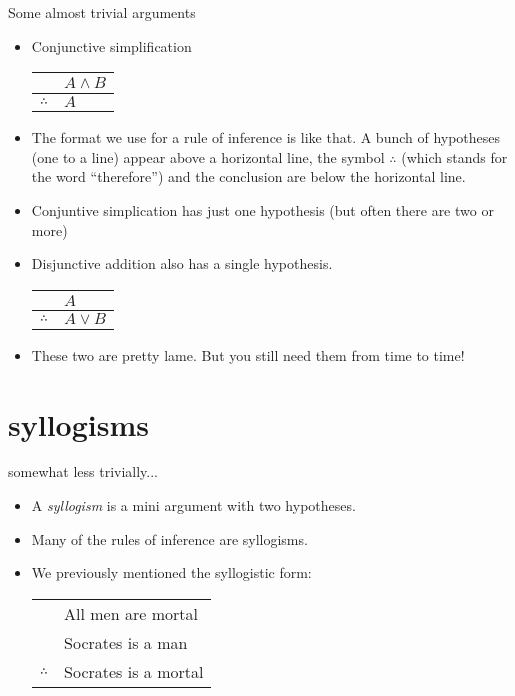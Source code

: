 \documentclass[landscape]{beamer}
\begin{document}
\begin{frame}{Some almost trivial arguments}
\begin{itemize}
\item Conjunctive simplification \pause 
\newline 

\begin{center}
\begin{tabular}{cl}
 & $A \land B$ \\ \hline
$\therefore$ & $A$ \\
\end{tabular}
\end{center}
\pause 

\item The format we use for a rule of inference is like that.  A bunch of hypotheses (one to a line) appear above a horizontal line, the symbol $\therefore$ (which stands for the word ``therefore'') and the conclusion are below the horizontal line. \pause
\item Conjuntive simplication has just one hypothesis (but often there are two or more) \pause
\item Disjunctive addition also has a single hypothesis. \pause \newline

\begin{center}
\begin{tabular}{cl}
 & $A$ \\ \hline
$\therefore$ & $A \lor B$ \\
\end{tabular}
\end{center}
\pause

\item These two are pretty lame. \pause But you still need them from time to time!

\end{itemize}
\end{frame}

\section{syllogisms}

\begin{frame}{somewhat less trivially...}
\begin{itemize}
\item A {\em syllogism} is a mini argument with two hypotheses. \pause
\item Many of the rules of inference are syllogisms. \pause
\item We previously mentioned the syllogistic form:

\begin{center}
\begin{tabular}{cl}
 & All men are mortal \\ 
 & Socrates is a man \\ \hline
$\therefore$ & Socrates is a mortal \\
\end{tabular}
\end{center}

\end{itemize}
\end{frame}
\end{document}
